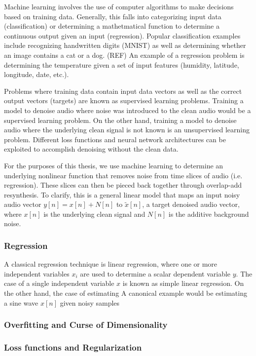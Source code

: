 Machine learning involves the use of computer algorithms to make decisions based on training data. Generally, this falls into categorizing input data (classification) or determining a mathetmatical function to determine a continuous output given an input (regression). Popular classification examples include recognizing handwritten digits (MNIST) as well as determining whether an image contains a cat or a dog. (REF) An example of a regression problem is determining the temperature given a set of input features (humidity, latitude, longitude, date, etc.).

Problems where training data contain input data vectors as well as the correct output vectors (targets) are known as supervised learning problems. Training a model to denoise audio where noise was introduced to the clean audio would be a supervised learning problem. On the other hand, training a model to denoise audio where the underlying clean signal is not known is an unsupervised learning problem. Different loss functions and neural network architectures can be exploited to accomplish denoising without the clean data.

For the purposes of this thesis, we use machine learning to determine an underlying nonlinear function that removes noise from time slices of audio (i.e. regression). These slices can then be pieced back together through overlap-add resynthesis. To clarify, this is a general linear model that maps an input noisy audio vector $y[n]=x[n]+N[n]$ to $\tilde{x}[n]$, a target denoised audio vector, where $x[n]$ is the underlying clean signal and $N[n]$ is the additive background noise.

\subsubsection{Regression}
A classical regression technique is linear regression, where one or more independent variables $x_{i}$ are used to determine a scalar dependent variable $y$. The case of a single independent variable $x$ is known as simple linear regression. On the other hand, the case of estimating  A canonical example would be estimating a sine wave $x[n]$ given noisy samples


\subsubsection{Overfitting and Curse of Dimensionality}


\subsubsection{Loss functions and Regularization}


